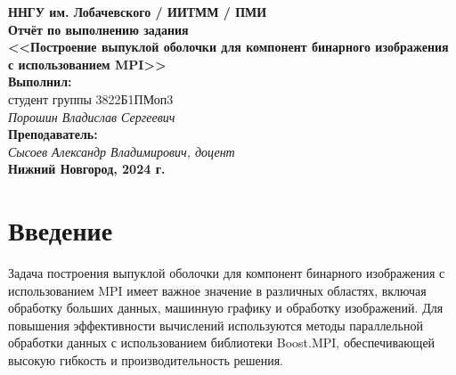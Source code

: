 \documentclass[12pt]{article}
\begin{document}
\begin{titlepage}
    \begin{center}
        \large
        \textbf{ННГУ им. Лобачевского / ИИТММ / ПМИ}\\[0.5cm]

        \vspace{4cm}
        \textbf{\Large Отчёт по выполнению задания}\\
        \textbf{\large <<Построение выпуклой оболочки для компонент бинарного изображения с использованием MPI>>}\\[3cm]

        \vspace{3cm}
        \textbf{Выполнил:}\\
        студент группы 3822Б1ПМоп3 \\
        \textit{Порошин Владислав Сергеевич}\\[1cm]

        \textbf{Преподаватель:}\\
        \textit{Сысоев Александр Владимирович, доцент}\\[2cm]

        \vfill
        \textbf{Нижний Новгород, 2024 г.}
    \end{center}
\end{titlepage}

\section*{Введение}
Задача построения выпуклой оболочки для компонент бинарного изображения с использованием MPI имеет важное значение в различных областях, включая обработку больших данных, машинную графику и обработку изображений. Для повышения эффективности вычислений используются методы параллельной обработки данных с использованием библиотеки Boost.MPI, обеспечивающей высокую гибкость и производительность решения.
\newpage

\end{document}
